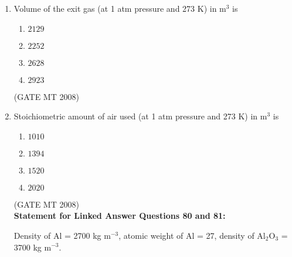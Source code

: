 \documentclass[11pt, letterpaper]{article}
\theoremstyle{remark}
\begin{document}
\begin{enumerate}
\textbf{Statement for Linked Answer Questions 78 and 79:}

1000 kg of zinc concentrate of composition 78\% ZnS and 22\% inerts is roasted in a multiple hearth furnace.
Roasting converts ZnS to ZnO, SO$_2$ and SO$_3$. The exit gas contains 6 vol.\% SO$_2$ and 2 vol.\% SO$_3$. \\
Molecular weights: Zn = 65, S = 32, O$_2$ = 32. \\
Composition of air (in vol.\%) = 21\% O$_2$ and 79\% N$_2$. \\
1 kg mol of gas occupies 22.4 m$^3$ at 273 K and 1 atm.

\item Volume of the exit gas (at 1 atm pressure and 273 K) in m$^3$ is
\begin{multicols}{4}
\begin{enumerate} 
\item $2129$
\item $2252$
\item $2628$
\item $2923$
\end{enumerate}
\end{multicols}
\hfill(GATE MT 2008)
\item Stoichiometric amount of air used (at 1 atm pressure and 273 K) in m$^3$ is
\begin{multicols}{4}
\begin{enumerate} 
\item $1010$
\item $1394$
\item $1520$
\item $2020$
\end{enumerate}
\end{multicols}
\hfill(GATE MT 2008)\\


\textbf{Statement for Linked Answer Questions 80 and 81:}

Density of Al = 2700 kg m$^{-3}$, atomic weight of Al = 27, density of Al$_2$O$_3$ = 3700 kg m$^{-3}$.


\end{enumerate}
\end{document}
